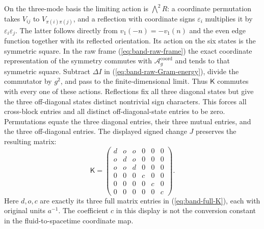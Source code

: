 On the three-mode basis the limiting action is $\bigwedge^2R$:
a coordinate permutation takes $V_{ij}$ to $V_{\pi(i)\pi(j)}$,
and a reflection with coordinate signs $\varepsilon_i$ multiplies
it by $\varepsilon_i\varepsilon_j$. The latter follows directly
from $v_1(-n)=-v_1(n)$ and the even edge function together with
its reflected orientation. Its action on the six states is the
symmetric square. In the raw frame (\ref{eq:band-raw-frame}) the
exact coordinate representation of the symmetry commutes with
$\mathcal A_g^{\mathrm{coord}}$ and tends to that symmetric square.
Subtract $\Delta I$ in (\ref{eq:band-raw-Gram-energy}), divide the
commutator by $g^2$, and pass to the finite-dimensional limit.
Thus $\mathsf K$ commutes with every one of these actions.
Reflections fix all three diagonal states but give the three
off-diagonal states distinct nontrivial sign characters. This
forces all cross-block entries and all distinct off-diagonal-state
entries to be zero. Permutations equate the three diagonal entries,
their three mutual entries, and the three off-diagonal entries.
The displayed signed change $J$ preserves the resulting matrix:
\begin{equation}\label{eq:band-three-channel-K}
 \mathsf K=\begin{pmatrix}
 d&o&o&0&0&0\\o&d&o&0&0&0\\o&o&d&0&0&0\\
 0&0&0&c&0&0\\0&0&0&0&c&0\\0&0&0&0&0&c
 \end{pmatrix}.
\end{equation}
Here $d,o,c$ are exactly its three full matrix entries in
(\ref{eq:band-full-K}), each with original units $a^{-1}$.
The coefficient $c$ in this display is not the conversion constant
in the fluid-to-spacetime coordinate map.

